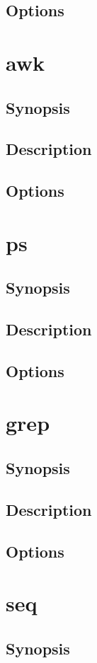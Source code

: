\documentclass[a4paper, 10pt, onecolumn, openright, oneside]{book}
\begin{document}
			\subsection{Options}
		\section{awk}
			\subsection{Synopsis}
			\subsection{Description}
			\subsection{Options}
		\section{ps}
			\subsection{Synopsis}
			\subsection{Description}
			\subsection{Options}
		\section{grep}
			\subsection{Synopsis}
			\subsection{Description}
			\subsection{Options}
		\section{seq}
			\subsection{Synopsis}
\end{document}
